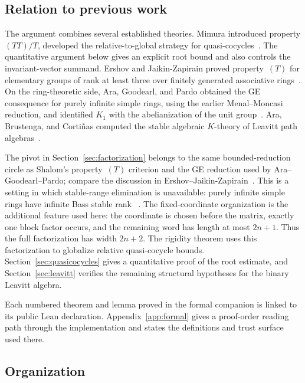 \documentclass[11pt]{amsart}
\theoremstyle{definition}
\theoremstyle{plain}
\begin{document}
\subsection*{Relation to previous work}

The argument combines several established theories.  Mimura
introduced property \((TT)/T\), developed the relative-to-global
strategy for quasi-cocycles~\cite{MimuraTT}.  The quantitative argument below gives
an explicit root bound and also controls the invariant-vector summand.
Ershov and Jaikin-Zapirain proved property~\((T)\) for elementary
groups of rank at least three over finitely generated associative
rings~\cite{ErshovJaikin}.
On the ring-theoretic side, Ara, Goodearl, and Pardo obtained the GE
consequence for purely infinite simple rings, using the earlier
Menal--Moncasi reduction, and identified \(K_1\) with the
abelianization of the unit group~\cite{MenalMoncasi,AraGoodearlPardo}.
Ara, Brustenga, and Corti\~nas
computed the stable algebraic \(K\)-theory of Leavitt path
algebras~\cite{AraBrustengaCortinas}.

The pivot in Section~\ref{sec:factorization} belongs to the same
bounded-reduction circle as Shalom's property~\((T)\) criterion and
the GE reduction used by Ara--Goodearl--Pardo; compare the discussion
in Ershov--Jaikin-Zapirain~\cite{ErshovJaikin}.  This is a setting in
which stable-range elimination is unavailable: purely infinite simple
rings have infinite Bass stable rank
~\cite[Theorem~2.8(2)]{AraGoodearlPardo}.
The fixed-coordinate organization is the additional feature used here:
the coordinate is chosen before the matrix, exactly one block factor
occurs, and the remaining word has length at most \(2n+1\).
Thus the full factorization has width \(2n+2\).  The rigidity theorem
uses this factorization to globalize relative quasi-cocycle bounds.
Section~\ref{sec:quasicocycles}
gives a quantitative proof of the root estimate, and
Section~\ref{sec:leavitt} verifies the remaining structural
hypotheses for the binary Leavitt algebra.

Each numbered theorem and lemma proved in the formal companion is
linked to its public Lean declaration.  Appendix~\ref{app:formal}
gives a proof-order reading path through the implementation and states
the definitions and trust surface used there.

\subsection*{Organization}
\end{document}
